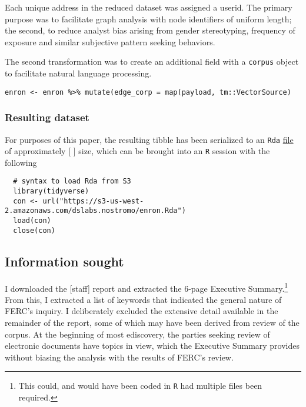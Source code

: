 \documentclass[]{article}
\let\rmarkdownfootnote\footnote%
\def\footnote{\protect\rmarkdownfootnote}
\begin{document}
Each unique address in the reduced dataset was assigned a userid. The
primary purpose was to facilitate graph analysis with node identifiers
of uniform length; the second, to reduce analyst bias arising from
gender stereotyping, frequency of exposure and similar subjective
pattern seeking behaviors.

The second transformation was to create an additional field with a
\texttt{corpus} object to facilitate natural language processing.

\begin{verbatim}
enron <- enron %>% mutate(edge_corp = map(payload, tm::VectorSource)
\end{verbatim}

\hypertarget{resulting-dataset}{%
\subsubsection{Resulting dataset}\label{resulting-dataset}}

For purposes of this paper, the resulting tibble has been serialized to
an \texttt{Rda}
\href{https://s3-us-west–2.amazonaws.com/dslabs.nostromo/enron.Rda}{file}
of approximately {[} {]} size, which can be brought into an \texttt{R}
session with the following

\begin{verbatim}
  # syntax to load Rda from S3
  library(tidyverse)
  con <- url("https://s3-us-west-2.amazonaws.com/dslabs.nostromo/enron.Rda")
  load(con)
  close(con)
\end{verbatim}

\hypertarget{information-sought}{%
\subsection{Information sought}\label{information-sought}}

I downloaded the {[}staff{]} report and extracted the 6-page Executive
Summary.\footnote{This could, and would have been coded in \texttt{R}
  had multiple files been required.} From this, I extracted a list of
keywords that indicated the general nature of FERC's inquiry. I
deliberately excluded the extensive detail available in the remainder of
the report, some of which may have been derived from review of the
corpus. At the beginning of most ediscovery, the parties seeking review
of electronic documents have topics in view, which the Executive Summary
provides without biasing the analysis with the results of FERC's review.
\end{document}
